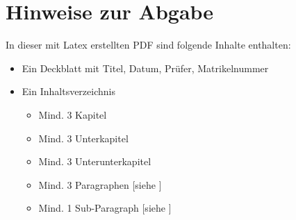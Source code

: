 \section*{Hinweise zur Abgabe} \label{chap:hinweise}

In dieser mit Latex erstellten PDF sind folgende Inhalte enthalten: 

\begin{itemize}
    \item Ein Deckblatt mit Titel, Datum, Prüfer, Matrikelnummer                               
    \item Ein Inhaltsverzeichnis     
        \begin{itemize}
            \item  Mind. 3 Kapitel                                           
            \item  Mind. 3 Unterkapitel                                                          
            \item  Mind. 3 Unterunterkapitel
            \item  Mind. 3 Paragraphen      [siehe ]
            \item  Mind. 1 Sub-Paragraph      [siehe ] 
        \end{itemize}                                                                           
     

\end{itemize}
